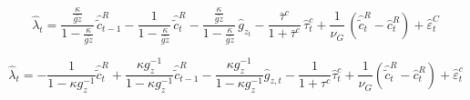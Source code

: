 \begin{dmath}
{\hat{\lambda}_{t}}=\frac{\frac{{\kappa}}{{\bar{gz}}}}{1-\frac{{\kappa}}{{\bar{gz}}}}\, {\hat{\tilde{c}}^R_{t-1}}-\frac{1}{1-\frac{{\kappa}}{{\bar{gz}}}}\, {\hat{\tilde{c}}^R_{t}}-\frac{\frac{{\kappa}}{{\bar{gz}}}}{1-\frac{{\kappa}}{{\bar{gz}}}}\, {\hat{g}_z_{t}}-\frac{{\bar{\tau}^c}}{1+{\bar{\tau}^c}}\, {\hat{\tau}^c_{t}}+\frac{1}{{\nu_G}}\, \left({\hat{\tilde{c}}^R_{t}}-{\hat{c}^R_{t}}\right)+{\hat{\varepsilon}^C_{t}}
\end{dmath}

{\color{red}
	\begin{equation}
	\hat{\lambda}_t=-\frac{1}{1-\kappa g_z^{-1}}\hat{\tilde{c}}_t^R+\frac{\kappa g_z^{-1}}{1-\kappa g_z^{-1}}\hat{\tilde{c}}_{t-1}^R-\frac{\kappa g_z^{-1}}{1-\kappa g_z^{-1}}\hat{g}_{z,t}-\frac{1}{1+\tau^c}\hat{\tau}_t^c+\frac{1}{\nu_G}\left(\hat{\tilde{c}}_t^R-\hat{c}_t^R\right)+\hat{\varepsilon}_t^c
	\end{equation}
}

